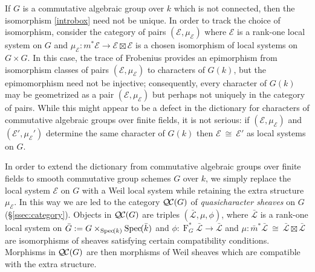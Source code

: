 \documentclass[CM,Submssn,SecEq]{degruyter-crelle} %
\theoremstyle{plain}
\theoremstyle{definition}
\theoremstyle{remark}
\newcommand{\bFq}{\bar{k}}
\newcommand{\Fq}{k}
\newcommand{\Frob}[1]{\operatorname{F}_{#1}}
\newcommand{\Spec}[1]{{\operatorname{Spec}\hskip-1pt( #1 )}}
\newcommand{\iso}{{\ \cong\ }}
\newcommand{\qcs}[1]{{\mathcal{#1}}}
\newcommand{\gqcs}[1]{{\mathcal{\bar #1}}}
\newcommand{\QC}{{\mathcal{Q\hskip-0.8pt C}}}
\begin{document}
If $G$ is a commutative algebraic group over $\Fq$ which is not connected, then the isomorphism \eqref{introbox} need not be unique. In order to track the choice of isomorphism, consider the category of pairs $(\qcs{E},\mu_\qcs{E})$ where $\qcs{E}$ is a rank-one local system on $G$ and $\mu_\qcs{E} : m^*\qcs{E} \to \qcs{E}\boxtimes\qcs{E}$ is a chosen isomorphism of local systems on $G\times G$. 
In this case, the trace of Frobenius provides an epimorphism from isomorphism classes of pairs $(\qcs{E},\mu_\qcs{E})$ to characters of $G(\Fq)$, but the epimomorphism need not be injective; consequently,
every character of $G(\Fq)$ may be geometrized as a pair $(\qcs{E},\mu_\qcs{E})$ but perhaps not uniquely in the category of pairs. 
While this might appear to be a defect in the dictionary for characters of commutative algebraic groups over finite fields, it is not serious: if $(\qcs{E},\mu_\qcs{E})$ and $(\qcs{E}',\mu_\qcs{E}')$ determine the same character of $G(\Fq)$ then $\qcs{E}\iso \qcs{E}'$ as local systems on $G$.

In order to extend the dictionary from commutative algebraic groups over finite fields to smooth commutative group schemes $G$ over $\Fq$,
we simply replace the local system $\qcs{E}$ on $G$ with a Weil local system while retaining the extra structure $\mu_\qcs{E}$. 
In this way we are led to the category $\QC(G)$ of {\it quasicharacter sheaves} on $G$ (\S\ref{ssec:category}).
Objects in $\QC(G)$ are triples $(\gqcs{L}, \mu,\phi)$, where $\gqcs{L}$ is a rank-one local system on ${\bar G} := G\times_{\Spec{\Fq}} \Spec{\bFq}$
and $\phi : \Frob{G}^* \gqcs{L}\to \gqcs{L}$ and $\mu : {\bar m}^* \gqcs{L} \iso \gqcs{L} \boxtimes \gqcs{L}$ are isomorphisms of sheaves satisfying certain compatibility conditions.
Morphisms in $\QC(G)$ are then morphisms of Weil sheaves which are compatible with the extra structure.
\end{document}
